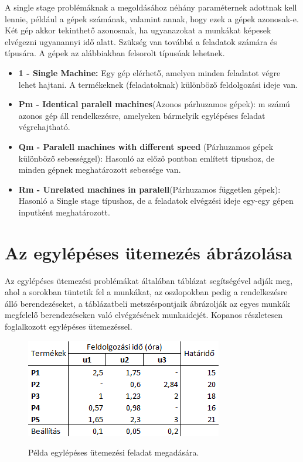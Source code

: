 \documentclass {report}
\begin{document}
A single stage problémáknak a megoldásához néhány paraméternek adottnak kell lennie, például a gépek számának, valamint annak, hogy ezek a gépek azonosak-e. Két gép akkor tekinthető azonosnak, ha ugyanazokat a munkákat képesek elvégezni ugyanannyi idő alatt. Szükség van továbbá a feladatok számára és típusára. A gépek az alábbiakban felsorolt típusúak lehetnek.
\begin{itemize}
\item \textbf{1 - Single Machine:} Egy gép elérhető, amelyen minden feladatot végre lehet hajtani. A termékeknek (feladatoknak) különböző feldolgozási ideje van. 
\item \textbf{Pm - Identical paralell machines}(Azonos párhuzamos gépek): m számú azonos gép áll rendelkezésre, amelyeken bármelyik egylépéses feladat végrehajtható.
\item \textbf{Qm - Paralell machines with different speed} (Párhuzamos gépek különböző sebességgel): Hasonló az előző pontban említett típushoz, de minden gépnek meghatározott sebessége van.
\item \textbf{Rm - Unrelated machines in paralell}(Párhuzamos független gépek): Hasonló a Single stage típushoz, de a feladatok elvégzési ideje egy-egy gépen inputként meghatározott.  
\end{itemize}

\section{Az egylépéses ütemezés ábrázolása}
Az egylépéses ütemezési problémákat általában táblázat segítségével adják meg, ahol a sorokban tüntetik fel a munkákat, az oszlopokban pedig a rendelkezésre álló berendezéseket, a táblázatbeli metszéspontjaik ábrázolják az egyes munkák megfelelő berendezéseken való elvégzésének munkaidejét. Kopanos részletesen foglalkozott egylépéses ütemezéssel. \\
\begin{figure}
\begin{center}
\includegraphics{tablazat1}\\
\caption{Példa egylépéses ütemezési feladat megadására.}
\end{center}
\end{figure}
\end{document}
